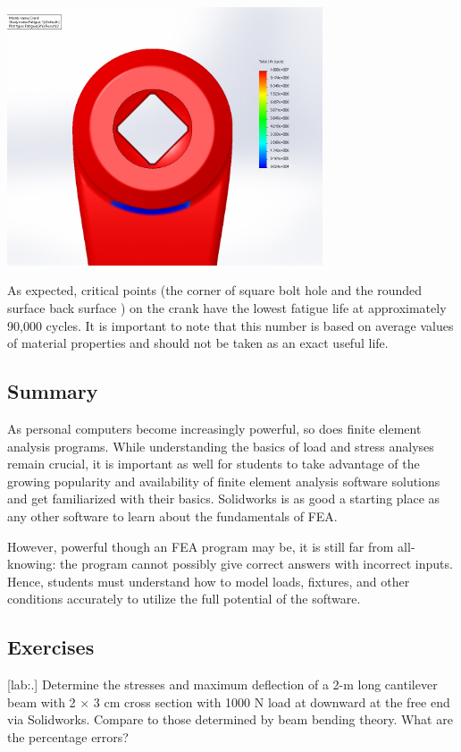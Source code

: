 \documentclass[a4paper,openany,nobib]{tufte-book}
\begin{document}
{{\begin{center}
\includegraphics[width=0.7\textwidth]{pictures/Intro-CAD/Crank-fatigue-back.jpg}
\end{center}

As expected, critical points (the corner of square bolt hole and the
rounded surface back surface ) on the crank have the lowest fatigue life
at approximately 90,000 cycles. It is important to note that this number
is based on average values of material properties and should not be
taken as an exact useful life.

\subsection{Summary}
\label{summary-9}
As personal computers become increasingly powerful, so does finite
element analysis programs. While understanding the basics of load and
stress analyses remain crucial, it is important as well for students to
take advantage of the growing popularity and availability of finite
element analysis software solutions and get familiarized with their
basics. Solidworks is as good a starting place as any other software to
learn about the fundamentals of FEA.

However, powerful though an FEA program may be, it is still far from
all-knowing: the program cannot possibly give correct answers with
incorrect inputs. Hence, students must understand how to model loads,
fixtures, and other conditions accurately to utilize the full potential
of the software.

\subsection{Exercises}
\label{exercises-9}
[lab:.] Determine the stresses and
maximum deflection of a 2-m long cantilever beam with 2 \(\times\) 3 cm
cross section with 1000 N load at downward at the free end via
Solidworks. Compare to those determined by beam bending theory. What are
the percentage errors?

}}
\end{document}
